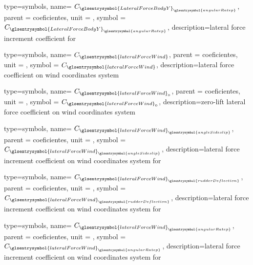 {type=symbols,
    name= \ensuremath{C_{{\glsentrysymbol{LateralForceBodyY}}_{\glsentrysymbol{angularRatep}}}},
    parent = {coeficientes},
    unit = \unexpanded{},
    symbol = \ensuremath{C_{{\glsentrysymbol{LateralForceBodyY}}_{\glsentrysymbol{angularRatep}}}},
    description={lateral force increment coefficient for }
}



{type=symbols,
    name= \ensuremath{C_{\glsentrysymbol{lateralForceWind}}},
    parent = {coeficientes},
    unit = \unexpanded{},
    symbol = \ensuremath{C_{\glsentrysymbol{lateralForceWind}}},
    description={lateral force coefficient on wind coordinates system }
}

{type=symbols,
    name= \ensuremath{C_{\glsentrysymbol{lateralForceWind}_{0}}},
    parent = {coeficientes},
    unit = \unexpanded{},
    symbol = \ensuremath{C_{\glsentrysymbol{lateralForceWind}_{0}}},
    description={zero-lift lateral force coefficient on wind coordinates system }
}

{type=symbols,
    name= \ensuremath{C_{{\glsentrysymbol{lateralForceWind}}_{\glsentrysymbol{angleSideslip}}}},
    parent = {coeficientes},
    unit = \unexpanded{},
    symbol = \ensuremath{C_{{\glsentrysymbol{lateralForceWind}}_{\glsentrysymbol{angleSideslip}}}},
    description={lateral force increment coefficient on wind coordinates system  for }
}

{type=symbols,
    name= \ensuremath{C_{{\glsentrysymbol{lateralForceWind}}_{\glsentrysymbol{rudderDeflection}}}}, 
    parent = {coeficientes},
    unit = \unexpanded{},
    symbol = \ensuremath{C_{{\glsentrysymbol{lateralForceWind}}_{\glsentrysymbol{rudderDeflection}}}},
    description={lateral force increment coefficient on wind coordinates system  for }
}


{type=symbols,
    name= \ensuremath{C_{{\glsentrysymbol{lateralForceWind}}_{\glsentrysymbol{angularRatep}}}},
    parent = {coeficientes},
    unit = \unexpanded{},
    symbol = \ensuremath{C_{{\glsentrysymbol{lateralForceWind}}_{\glsentrysymbol{angularRatep}}}},
    description={lateral force increment coefficient on wind coordinates system  for }
}


